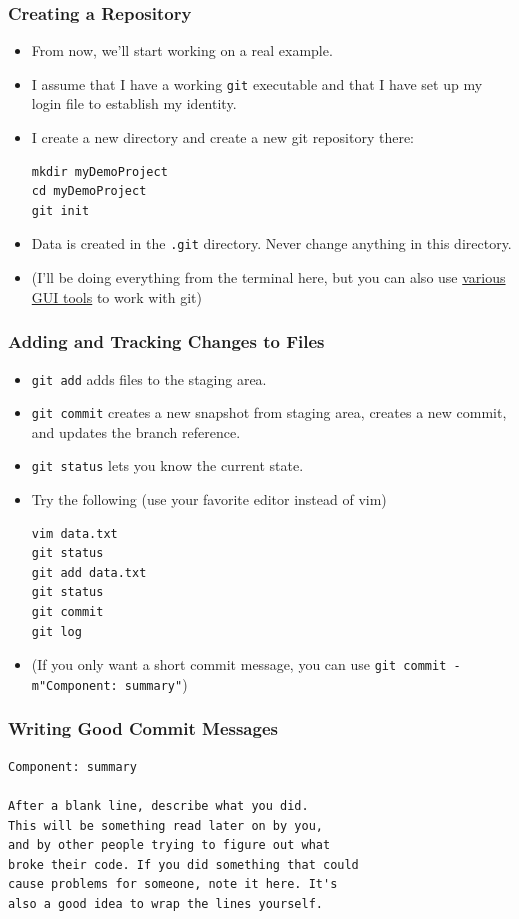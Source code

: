 \begin{frame}[fragile]
\frametitle{Creating a Repository}
\begin{itemize}
\item From now, we'll start working on a real example.
\item I assume that I have a working \lstinline{git} executable and that I have set up my login file to establish my identity.
\item I create a new directory and create a new git repository there:
\begin{lstlisting}
mkdir myDemoProject
cd myDemoProject
git init
\end{lstlisting}
\item Data is created in the \lstinline{.git} directory. Never change anything in this directory.
\item (I'll be doing everything from the terminal here, but you can also use \href{https://git-scm.com/downloads/guis}{various GUI tools} to work with git)
\end{itemize}
\end{frame}

\begin{frame}[fragile]
\frametitle{Adding and Tracking Changes to Files}
\begin{itemize}
\item \lstinline{git add} adds files to the staging area.
\item \lstinline{git commit} creates a new snapshot from staging area, creates a new commit, and updates the branch reference.
\item \lstinline{git status} lets you know the current state.
\item Try the following (use your favorite editor instead of vim)
\begin{lstlisting}
vim data.txt
git status
git add data.txt
git status
git commit
git log
\end{lstlisting}
\item (If you only want a short commit message, you can use \lstinline{git commit -m"Component: summary"})
\end{itemize}
\end{frame}

\begin{frame}[fragile]
\frametitle{Writing Good Commit Messages}
\begin{lstlisting}
Component: summary

After a blank line, describe what you did.
This will be something read later on by you,
and by other people trying to figure out what
broke their code. If you did something that could
cause problems for someone, note it here. It's
also a good idea to wrap the lines yourself.
\end{lstlisting}
\end{frame}

